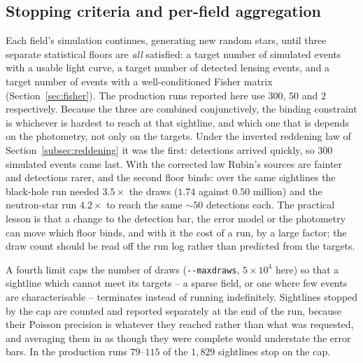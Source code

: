 \documentclass[english,10pt,a4paper]{article}
\begin{document}
	\subsection{Stopping criteria and per-field aggregation}
	
	Each field's simulation continues, generating new random stars, until three separate statistical floors are \emph{all} satisfied: a target number of simulated events with a usable light curve, a target number of detected lensing events, and a target number of events with a well-conditioned Fisher matrix (Section~\ref{sec:fisher}). The production runs reported here use $300$, $50$ and $2$ respectively. Because the three are combined conjunctively, the binding constraint is whichever is hardest to reach at that sightline, and which one that is depends on the photometry, not only on the targets. Under the inverted reddening law of Section~\ref{subsec:reddening} it was the first: detections arrived quickly, so $300$ simulated events came last. With the corrected law Rubin's sources are fainter and detections rarer, and the second floor binds: over the same sightlines the black-hole run needed $3.5\times$ the draws ($1.74$ against $0.50$ million) and the neutron-star run $4.2\times$ to reach the same $\sim\!50$ detections each. The practical lesson is that a change to the detection bar, the error model or the photometry can move which floor binds, and with it the cost of a run, by a large factor; the draw count should be read off the run log rather than predicted from the targets.

	A fourth limit caps the number of draws (\texttt{-{}-maxdraws}, $5\times10^{4}$ here) so that a sightline which cannot meet its targets -- a sparse field, or one where few events are characterisable -- terminates instead of running indefinitely. Sightlines stopped by the cap are counted and reported separately at the end of the run, because their Poisson precision is whatever they reached rather than what was requested, and averaging them in as though they were complete would understate the error bars. In the production runs $79$--$115$ of the $1{,}829$ sightlines stop on the cap.
\end{document}
